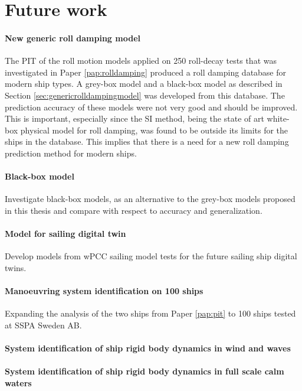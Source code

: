 \chapter{Future work\label{ch:future_work}}

\subsubsection*{New generic roll damping model}
The PIT of the roll motion models applied on 250 roll-decay tests that was investigated in Paper \ref{pap:rolldamping} produced a roll damping database for modern ship types. A grey-box model and a black-box model as described in Section \ref{sec:genericrolldampingmodel} was developed from this database. The prediction accuracy of these models were not very good and should be improved. This is important, especially since the SI method, being the state of art white-box physical model for roll damping, was found to be outside its limits for the ships in the database. This implies that there is a need for a new roll damping prediction method for modern ships.  

\subsubsection*{Black-box model}
Investigate black-box models, as an alternative to the grey-box models proposed in this thesis and compare with respect to accuracy and generalization.

\subsubsection*{Model for sailing digital twin}
Develop models from wPCC sailing model tests for the future sailing ship digital twins.

\subsubsection*{Manoeuvring system identification on 100 ships}
Expanding the analysis of the two ships from Paper \ref{pap:pit} to 100 ships tested at SSPA Sweden AB.

\subsubsection*{System identification of ship rigid body dynamics in wind and waves}

\subsubsection*{System identification of ship rigid body dynamics in full scale calm waters}
